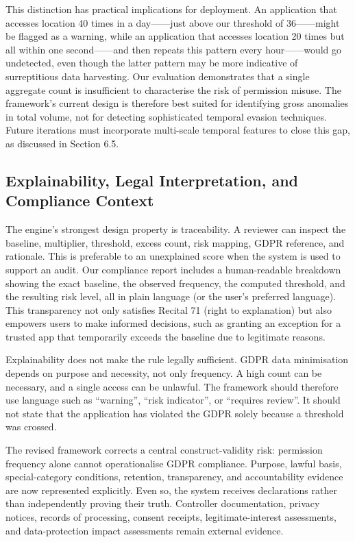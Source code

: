 This distinction has practical implications for deployment. An application that accesses location 40 times in a day——just above our threshold of 36——might be flagged as a warning, while an application that accesses location 20 times but all within one second——and then repeats this pattern every hour——would go undetected, even though the latter pattern may be more indicative of surreptitious data harvesting. Our evaluation demonstrates that a single aggregate count is insufficient to characterise the risk of permission misuse. The framework's current design is therefore best suited for identifying gross anomalies in total volume, not for detecting sophisticated temporal evasion techniques. Future iterations must incorporate multi-scale temporal features to close this gap, as discussed in Section 6.5.

\subsection{Explainability, Legal Interpretation, and Compliance Context}

The engine's strongest design property is traceability. A reviewer can inspect the baseline, multiplier, threshold, excess count, risk mapping, GDPR reference, and rationale. This is preferable to an unexplained score when the system is used to support an audit. Our compliance report includes a human-readable breakdown showing the exact baseline, the observed frequency, the computed threshold, and the resulting risk level, all in plain language (or the user's preferred language). This transparency not only satisfies Recital 71 (right to explanation) but also empowers users to make informed decisions, such as granting an exception for a trusted app that temporarily exceeds the baseline due to legitimate reasons.

Explainability does not make the rule legally sufficient. GDPR data minimisation depends on purpose and necessity, not only frequency. A high count can be necessary, and a single access can be unlawful. The framework should therefore use language such as ``warning'', ``risk indicator'', or ``requires review''. It should not state that the application has violated the GDPR solely because a threshold was crossed.

The revised framework corrects a central construct-validity risk: permission frequency alone cannot operationalise GDPR compliance. Purpose, lawful basis, special-category conditions, retention, transparency, and accountability evidence are now represented explicitly. Even so, the system receives declarations rather than independently proving their truth. Controller documentation, privacy notices, records of processing, consent receipts, legitimate-interest assessments, and data-protection impact assessments remain external evidence.


